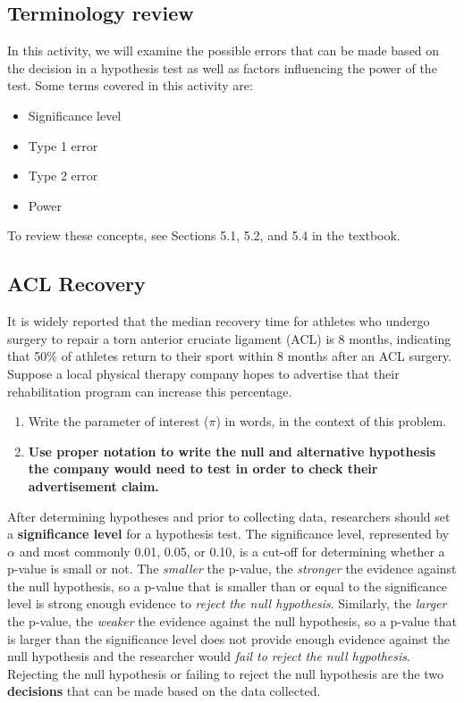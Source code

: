 \documentclass[
]{report}
\begin{document}
\hypertarget{terminology-review-14}{%
\subsection{Terminology review}\label{terminology-review-14}}

In this activity, we will examine the possible errors that can be made based on the decision in a hypothesis test as well as factors influencing the power of the test. Some terms covered in this activity are:

\begin{itemize}
\item
  Significance level
\item
  Type 1 error
\item
  Type 2 error
\item
  Power
\end{itemize}

To review these concepts, see Sections 5.1, 5.2, and 5.4 in the textbook.

\hypertarget{acl-recovery}{%
\subsection{ACL Recovery}\label{acl-recovery}}

It is widely reported that the median recovery time for athletes who undergo surgery to repair a torn anterior cruciate ligament (ACL) is 8 months, indicating that 50\% of athletes return to their sport within 8 months after an ACL surgery. Suppose a local physical therapy company hopes to advertise that their rehabilitation program can increase this percentage.

\begin{enumerate}
\def\labelenumi{\arabic{enumi}.}
\item
  Write the parameter of interest (\(\pi\)) in words, in the context of this problem.
  \vspace{0.5in}
\item
  \textbf{Use proper notation to write the null and alternative hypothesis the company would need to test in order to check their advertisement claim.}
  \vspace{0.5in}
\end{enumerate}

After determining hypotheses and prior to collecting data, researchers should set a \textbf{significance level} for a hypothesis test. The significance level, represented by \(\alpha\) and most commonly 0.01, 0.05, or 0.10, is a cut-off for determining whether a p-value is small or not. The \emph{smaller} the p-value, the \emph{stronger} the evidence against the null hypothesis, so a p-value that is smaller than or equal to the significance level is strong enough evidence to \emph{reject the null hypothesis}. Similarly, the \emph{larger} the p-value, the \emph{weaker} the evidence against the null hypothesis, so a p-value that is larger than the significance level does not provide enough evidence against the null hypothesis and the researcher would \emph{fail to reject the null hypothesis}. Rejecting the null hypothesis or failing to reject the null hypothesis are the two \textbf{decisions} that can be made based on the data collected.
\end{document}

